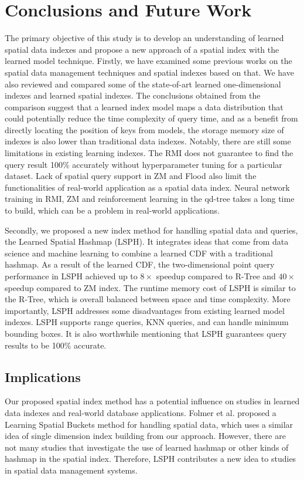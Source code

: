 \chapter{Conclusions and Future Work}
The primary objective of this study is to develop an understanding of learned spatial data indexes and propose a new approach of a spatial index with the learned model technique. Firstly, we have examined some previous works on the spatial data management techniques and spatial indexes based on that. We have also reviewed and compared some of the state-of-art learned one-dimensional indexes and learned spatial indexes. The conclusions obtained from the comparison suggest that a learned index model maps a data distribution that could potentially reduce the time complexity of query time, and as a benefit from directly locating the position of keys from models, the storage memory size of indexes is also lower than traditional data indexes. Notably, there are still some limitations in existing learning indexes. The RMI does not guarantee to find the query result 100\% accurately without hyperparameter tuning for a particular dataset. Lack of spatial query support in ZM and Flood also limit the functionalities of real-world application as a spatial data index. Neural network training in RMI, ZM and reinforcement learning in the qd-tree takes a long time to build, which can be a problem in real-world applications. 

Secondly, we proposed a new index method for handling spatial data and queries, the Learned Spatial Hashmap (LSPH). It integrates ideas that come from data science and machine learning to combine a learned CDF with a traditional hashmap. As a result of the learned CDF, the two-dimensional point query performance in LSPH achieved up to $8\times$ speedup compared to R-Tree and  $40\times$ speedup compared to ZM index.  The runtime memory cost of LSPH is similar to the R-Tree, which is overall balanced between space and time complexity. More importantly, LSPH addresses some disadvantages from existing learned model indexes. LSPH supports range queries, KNN queries, and can handle minimum bounding boxes. It is also worthwhile mentioning that LSPH guarantees query results to be 100\% accurate. 


\section{Implications}
Our proposed spatial index method has a potential influence on studies in learned data indexes and real-world database applications. Folmer et al. \cite{Folmer:vg} proposed a Learning Spatial Buckets method for handling spatial data, which uses a similar idea of single dimension index building from our approach. However, there are not many studies that investigate the use of learned hashmap or other kinds of hashmap in the spatial index. Therefore, LSPH contributes a new idea to studies in spatial data management systems. 


